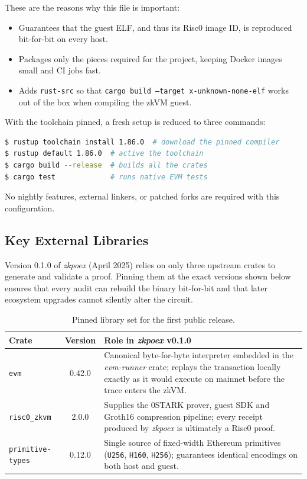 These are the reasons why this file is important:

\begin{itemize}
  \item Guarantees that the guest ELF, and thus its Risc0 image ID, is reproduced bit-for-bit on every host.
  \item Packages only the pieces required for the project, keeping Docker images small and CI jobs fast.
  \item Adds \texttt{rust-src} so that \texttt{cargo build
        --target x-unknown-none-elf} works out of the box when
        compiling the zkVM guest.
\end{itemize}

With the toolchain pinned, a fresh setup is reduced to three commands:

\begin{lstlisting}[language=bash]
$ rustup toolchain install 1.86.0  # download the pinned compiler
$ rustup default 1.86.0  # active the toolchain
$ cargo build --release  # builds all the crates
$ cargo test             # runs native EVM tests
\end{lstlisting}

No nightly features, external linkers, or patched forks are required with this configuration.


\subsection{Key External Libraries}  

Version 0.1.0 of \textit{zkpoex} (April 2025) relies on only three upstream
crates to generate and validate a proof.  Pinning them at the exact versions
shown below ensures that every audit can rebuild the binary bit-for-bit and
that later ecosystem upgrades cannot silently alter the circuit.

\begin{table}[h]
  \renewcommand{\arraystretch}{1.15}
  \centering
  \begin{tabularx}{\textwidth}{|l|c|X|}
    \hline
    \textbf{Crate} & \textbf{Version} & \textbf{Role in \textit{zkpoex} v0.1.0} \\ \hline
    \texttt{evm}\footnotemark[1]            & 0.42.0 & Canonical byte-for-byte interpreter embedded in the \textit{evm-runner} crate; replays the transaction locally exactly as it would execute on mainnet before the trace enters the zkVM. \\ \hline
    \texttt{risc0\_zkvm}\footnotemark[2]    & 2.0.0  & Supplies the 0STARK prover, guest SDK and Groth16 compression pipeline; every receipt produced by \textit{zkpoex} is ultimately a Risc0 proof. \\ \hline
    \texttt{primitive-types}               & 0.12.0 & Single source of fixed-width Ethereum primitives (\texttt{U256}, \texttt{H160}, \texttt{H256}); guarantees identical encodings on both host and guest. \\ \hline
  \end{tabularx}
  \caption{Pinned library set for the first public release.}
  \label{tbl:libraries}
\end{table}

